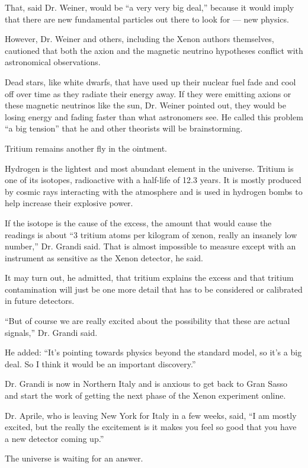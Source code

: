 That, said Dr. Weiner, would be ``a very very big deal,'' because it
would imply that there are new fundamental particles out there to look
for --- new physics.

However, Dr. Weiner and others, including the Xenon authors themselves,
cautioned that both the axion and the magnetic neutrino hypotheses
conflict with astronomical observations.

Dead stars, like white dwarfs, that have used up their nuclear fuel fade
and cool off over time as they radiate their energy away. If they were
emitting axions or these magnetic neutrinos like the sun, Dr. Weiner
pointed out, they would be losing energy and fading faster than what
astronomers see. He called this problem ``a big tension'' that he and
other theorists will be brainstorming.

Tritium remains another fly in the ointment.

Hydrogen is the lightest and most abundant element in the universe.
Tritium is one of its isotopes, radioactive with a half-life of 12.3
years. It is mostly produced by cosmic rays interacting with the
atmosphere and is used in hydrogen bombs to help increase their
explosive power.

If the isotope is the cause of the excess, the amount that would cause
the readings is about ``3 tritium atoms per kilogram of xenon, really an
insanely low number,'' Dr. Grandi said. That is almost impossible to
measure except with an instrument as sensitive as the Xenon detector, he
said.

It may turn out, he admitted, that tritium explains the excess and that
tritium contamination will just be one more detail that has to be
considered or calibrated in future detectors.

``But of course we are really excited about the possibility that these
are actual signals,'' Dr. Grandi said.

He added: ``It's pointing towards physics beyond the standard model, so
it's a big deal. So I think it would be an important discovery.''

Dr. Grandi is now in Northern Italy and is anxious to get back to Gran
Sasso and start the work of getting the next phase of the Xenon
experiment online.

Dr. Aprile, who is leaving New York for Italy in a few weeks, said, ``I
am mostly excited, but the really the excitement is it makes you feel so
good that you have a new detector coming up.''

The universe is waiting for an answer.

